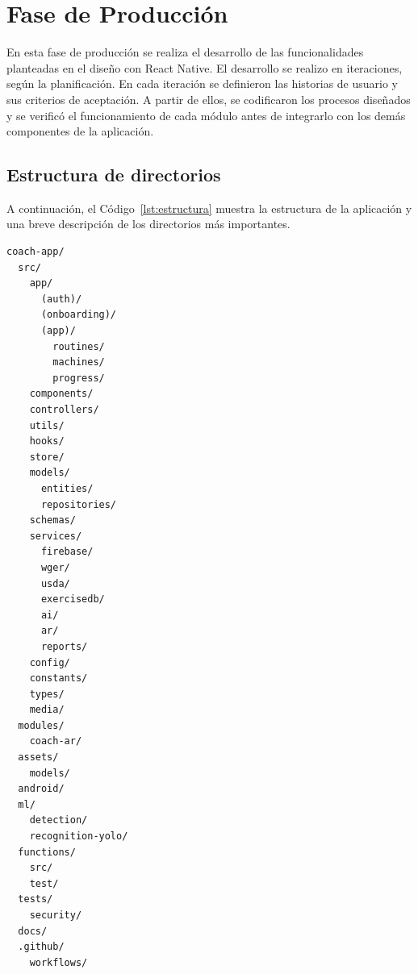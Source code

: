 \section{Fase de Producción}
\label{sec:des-produccion}

En esta fase de producción se realiza el desarrollo de las funcionalidades 
planteadas en el diseño con React Native. El desarrollo se realizo en iteraciones,
según la planificación. En cada iteración se definieron las historias de usuario y sus criterios
de aceptación. A partir de ellos, se codificaron los procesos diseñados
y se verificó el funcionamiento de cada módulo antes de integrarlo con
los demás componentes de la aplicación.

\subsection{Estructura de directorios}

A continuación, el Código~\ref{lst:estructura} muestra la estructura de la aplicación y una
breve descripción de los directorios más importantes.

\begin{lstlisting}[language={}, numbers=none, caption={Estructura de carpetas del código fuente}, label={lst:estructura}]
coach-app/
  src/
    app/
      (auth)/
      (onboarding)/
      (app)/
        routines/
        machines/
        progress/
    components/
    controllers/
    utils/
    hooks/
    store/
    models/
      entities/
      repositories/
    schemas/
    services/
      firebase/
      wger/
      usda/
      exercisedb/
      ai/
      ar/
      reports/
    config/
    constants/
    types/
    media/
  modules/
    coach-ar/
  assets/
    models/
  android/
  ml/
    detection/
    recognition-yolo/
  functions/
    src/
    test/
  tests/
    security/
  docs/
  .github/
    workflows/
\end{lstlisting} 

